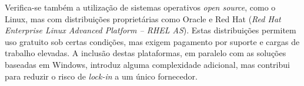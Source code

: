 \documentclass[12pt,a4paper,final]{article}
\begin{document}
    Verifica-se também a utilização de sistemas operativos \textit{open source}, como o Linux, mas com distribuições proprietárias como Oracle e Red Hat (\textit{Red Hat Enterprise Linux Advanced Platform – RHEL AS}). Estas distribuições permitem uso gratuito sob certas condições, mas exigem pagamento por suporte e cargas de trabalho elevadas.
    A inclusão destas plataformas, em paralelo com as soluções baseadas em Windows, introduz alguma complexidade adicional, mas contribui para reduzir o risco de \textit{lock-in} a um único fornecedor.

    \newpage
    \printbibliography
\end{document}

